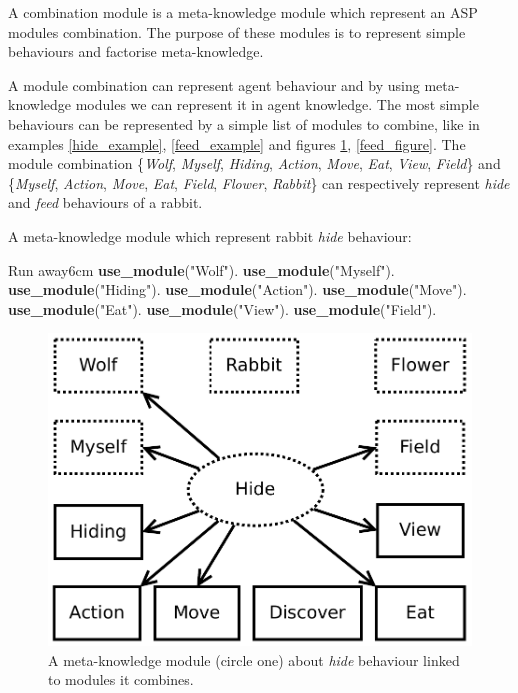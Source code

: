 \documentclass{aamas2012}
\begin{document}
	\begin{definition}
		A combination module is a meta-knowledge module which represent an ASP modules combination.	
		The purpose of these modules is to represent simple behaviours and factorise meta-knowledge.
	\end{definition}
	
	A module combination can represent agent behaviour and by using meta-knowledge modules we can represent it in agent knowledge.
	The most simple behaviours can be represented by a simple list of modules to combine, like in examples \ref{hide_example}, 
	\ref{feed_example} and figures \ref{hide_figure}, \ref{feed_figure}.
	The module combination \{\emph{Wolf}, \emph{Myself}, \emph{Hiding}, \emph{Action}, \emph{Move}, \emph{Eat}, \emph{View}, \emph{Field}\} 
	and \{\emph{Myself}, \emph{Action}, \emph{Move}, \emph{Eat}, \emph{Field}, \emph{Flower}, \emph{Rabbit}\} 
	can respectively represent \emph{hide} and \emph{feed} behaviours of a rabbit.
	
	\begin{example}
		\label{hide_example}
		A meta-knowledge module which represent rabbit \emph{hide} behaviour:\newline
		\begin{module}{Run away}{6cm}
			\textbf{use\_module}("Wolf").\newline
			\textbf{use\_module}("Myself").\newline
			\textbf{use\_module}("Hiding").\newline
			\textbf{use\_module}("Action").\newline
			\textbf{use\_module}("Move").\newline
			\textbf{use\_module}("Eat").\newline
			\textbf{use\_module}("View").\newline
			\textbf{use\_module}("Field").
		\end{module}
	\end{example}
	
	\begin{figure}
		\centering
		\includegraphics[keepaspectratio=true, scale=0.4]{hide.pdf}
		\caption
		{
			\label{hide_figure}
			A meta-knowledge module (circle one) about \emph{hide} behaviour linked to modules it combines.
		}
	\end{figure}
	
\end{document}
